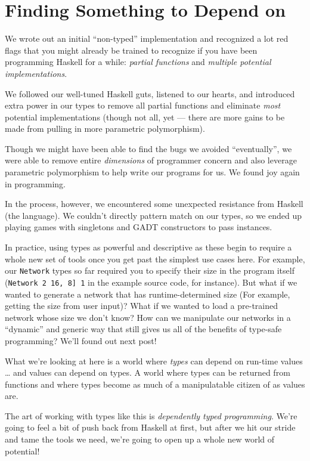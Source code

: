 \documentclass[]{article}
\begin{document}
\section{Finding Something to Depend on}\label{finding-something-to-depend-on}

We wrote out an initial ``non-typed'' implementation and recognized a lot red
flags that you might already be trained to recognize if you have been
programming Haskell for a while: \emph{partial functions} and \emph{multiple
potential implementations}.

We followed our well-tuned Haskell guts, listened to our hearts, and introduced
extra power in our types to remove all partial functions and eliminate
\emph{most} potential implementations (though not all, yet --- there are more
gains to be made from pulling in more parametric polymorphism).

Though we might have been able to find the bugs we avoided ``eventually'', we
were able to remove entire \emph{dimensions} of programmer concern and also
leverage parametric polymorphism to help write our programs for us. We found joy
again in programming.

In the process, however, we encountered some unexpected resistance from Haskell
(the language). We couldn't directly pattern match on our types, so we ended up
playing games with singletons and GADT constructors to pass instances.

In practice, using types as powerful and descriptive as these begin to require a
whole new set of tools once you get past the simplest use cases here. For
example, our \texttt{Network} types so far required you to specify their size in
the program itself (\texttt{Network\ 2\ \textquotesingle{}{[}16,\ 8{]}\ 1} in
the example source code, for instance). But what if we wanted to generate a
network that has runtime-determined size (For example, getting the size from
user input)? What if we wanted to load a pre-trained network whose size we don't
know? How can we manipulate our networks in a ``dynamic'' and generic way that
still gives us all of the benefits of type-safe programming? We'll found out
next post!

What we're looking at here is a world where \emph{types} can depend on run-time
values \ldots{} and values can depend on types. A world where types can be
returned from functions and where types become as much of a manipulatable
citizen of as values are.

The art of working with types like this is \emph{dependently typed programming}.
We're going to feel a bit of push back from Haskell at first, but after we hit
our stride and tame the tools we need, we're going to open up a whole new world
of potential!
\end{document}
